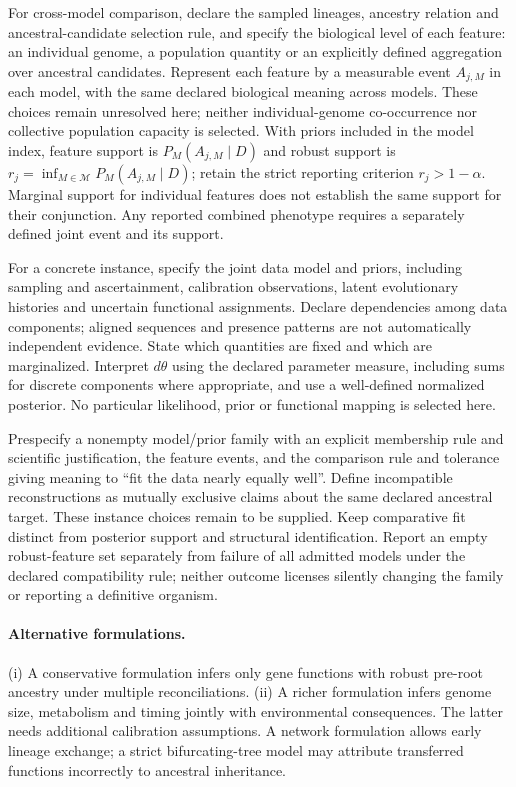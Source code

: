 \documentclass[11pt]{article}
\begin{document}
For cross-model comparison, declare the sampled lineages, ancestry relation and ancestral-candidate selection rule, and specify the biological level of each feature: an individual genome, a population quantity or an explicitly defined aggregation over ancestral candidates. Represent each feature by a measurable event $A_{j,M}$ in each model, with the same declared biological meaning across models. These choices remain unresolved here; neither individual-genome co-occurrence nor collective population capacity is selected. With priors included in the model index, feature support is $P_M(A_{j,M}\mid D)$ and robust support is $r_j=\inf_{M\in\mathcal M}P_M(A_{j,M}\mid D)$; retain the strict reporting criterion $r_j>1-\alpha$. Marginal support for individual features does not establish the same support for their conjunction. Any reported combined phenotype requires a separately defined joint event and its support.

For a concrete instance, specify the joint data model and priors, including sampling and ascertainment, calibration observations, latent evolutionary histories and uncertain functional assignments. Declare dependencies among data components; aligned sequences and presence patterns are not automatically independent evidence. State which quantities are fixed and which are marginalized. Interpret $d\theta$ using the declared parameter measure, including sums for discrete components where appropriate, and use a well-defined normalized posterior. No particular likelihood, prior or functional mapping is selected here.

Prespecify a nonempty model/prior family with an explicit membership rule and scientific justification, the feature events, and the comparison rule and tolerance giving meaning to ``fit the data nearly equally well''. Define incompatible reconstructions as mutually exclusive claims about the same declared ancestral target. These instance choices remain to be supplied. Keep comparative fit distinct from posterior support and structural identification. Report an empty robust-feature set separately from failure of all admitted models under the declared compatibility rule; neither outcome licenses silently changing the family or reporting a definitive organism.

\paragraph{Alternative formulations.} (i) A conservative formulation infers only gene functions with robust pre-root ancestry under multiple reconciliations. (ii) A richer formulation infers genome size, metabolism and timing jointly with environmental consequences. The latter needs additional calibration assumptions. A network formulation allows early lineage exchange; a strict bifurcating-tree model may attribute transferred functions incorrectly to ancestral inheritance.
\end{document}
